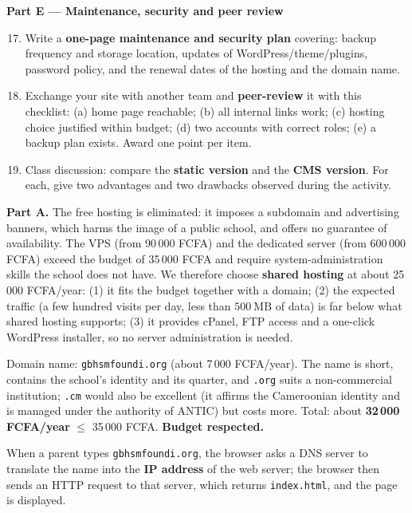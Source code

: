 \documentclass[11pt]{article}
\newcommand{\cle}[1]{{\popxbold\color{popdark}#1}}
\newcounter{popsec}
\newcounter{popsub}
\newcommand{\courssub}[1]{%
  \stepcounter{popsub}%
  \par\vspace{9pt}\noindent{\popxbold\fontsize{11.5}{13}\selectfont\color{popink}{\color{poporange}\thepopsec.\thepopsub}\hspace{6pt}#1}\par\nopagebreak\vspace{4pt}
}
\begin{document}
\textbf{Part E — Maintenance, security and peer review}

\begin{enumerate}
\setcounter{enumi}{16}
\item Write a \textbf{one-page maintenance and security plan} covering: backup frequency and storage location, updates of WordPress/theme/plugins, password policy, and the renewal dates of the hosting and the domain name.
\item Exchange your site with another team and \textbf{peer-review} it with this checklist: (a) home page reachable; (b) all internal links work; (c) hosting choice justified within budget; (d) two accounts with correct roles; (e) a backup plan exists. Award one point per item.
\item Class discussion: compare the \textbf{static version} and the \textbf{CMS version}. For each, give two advantages and two drawbacks observed during the activity.
\end{enumerate}

\courssub{Model answer}

\textbf{Part A.} The free hosting is eliminated: it imposes a subdomain and advertising banners, which harms the image of a public school, and offers no guarantee of availability. The VPS (from 90\,000 FCFA) and the dedicated server (from 600\,000 FCFA) exceed the budget of 35\,000 FCFA and require system-administration skills the school does not have. We therefore choose \textbf{shared hosting} at about 25\,000 FCFA/year: (1) it fits the budget together with a domain; (2) the expected traffic (a few hundred visits per day, less than $500\ \mathrm{MB}$ of data) is far below what shared hosting supports; (3) it provides cPanel, FTP access and a one-click WordPress installer, so no server administration is needed.

Domain name: \texttt{gbhsmfoundi.org} (about 7\,000 FCFA/year). The name is short, contains the school's identity and its quarter, and \texttt{.org} suits a non-commercial institution; \texttt{.cm} would also be excellent (it affirms the Cameroonian identity and is managed under the authority of ANTIC) but costs more. Total: about \textbf{32\,000 FCFA/year} $\leq$ 35\,000 FCFA. \textbf{Budget respected.}

When a parent types \texttt{gbhsmfoundi.org}, the browser asks a \cle{DNS server} to translate the name into the \textbf{IP address} of the web server; the browser then sends an HTTP request to that server, which returns \texttt{index.html}, and the page is displayed.
\end{document}
